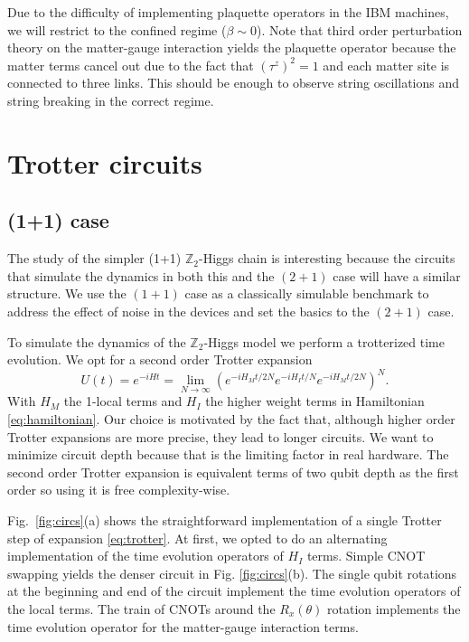 \documentclass[a4paper]{article}
\begin{document}
Due to the difficulty of implementing plaquette operators in the IBM machines, we will restrict to the confined regime ($\beta \sim 0$). Note that third order perturbation theory on the matter-gauge interaction yields the plaquette operator because the matter terms cancel out due to the fact that $(\tau^z)^2 = 1$ and each matter site is connected to three links. This should be enough to observe string oscillations and string breaking in the correct regime.

\section{Trotter circuits}

\subsection{(1+1) case} \label{subsec:circuit_1d}

The study of the simpler (1+1) $\mathbb{Z}_2$-Higgs chain is interesting because the circuits that simulate the dynamics in both this and the $(2+1)$ case will have a similar structure. We use the $(1+1)$ case as a classically simulable benchmark to address the effect of noise in the devices and set the basics to the $(2+1)$ case.

To simulate the dynamics of the $\mathbb{Z}_2$-Higgs model we perform a trotterized time evolution. We opt for a second order Trotter expansion
%
\begin{equation}
    U(t) = e^{-i H t} = \lim_{N \to \infty}\left( e^{-i H_M t/2N} e^{-i H_I t/N} e^{-i H_M t/2N} \right)^N.
    \label{eq:trotter}
\end{equation}
%
With $H_M$ the 1-local terms and $H_I$ the higher weight terms in Hamiltonian \eqref{eq:hamiltonian}. Our choice is motivated by the fact that, although higher order Trotter expansions are more precise, they lead to longer circuits. We want to minimize circuit depth because that is the limiting factor in real hardware. The second order Trotter expansion is equivalent terms of two qubit depth as the first order so using it is free complexity-wise.

Fig.~\ref{fig:circs}(a) shows the straightforward implementation of a single Trotter step of expansion \eqref{eq:trotter}. At first, we opted to do an alternating implementation of the time evolution operators of $H_I$ terms. Simple CNOT swapping yields the denser circuit in Fig. \ref{fig:circs}(b). The single qubit rotations at the beginning and end of the circuit implement the time evolution operators of the local terms. The train of CNOTs around the $R_x(\theta)$ rotation implements the time evolution operator for the matter-gauge interaction terms.
\end{document}
